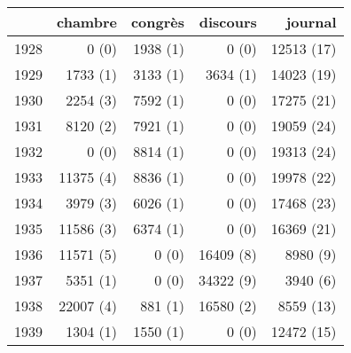 \documentclass[11pt,a4paper]{article}
\begin{document}
\begin{table} 
        \begin{tabular}{|l|r|r|r|r|} 
 \hline&chambre&congrès&discours&journal\\
\hline 
1928&0 (0)&1938 (1)&0 (0)&12513 (17)\\
1929&1733 (1)&3133 (1)&3634 (1)&14023 (19)\\
1930&2254 (3)&7592 (1)&0 (0)&17275 (21)\\
1931&8120 (2)&7921 (1)&0 (0)&19059 (24)\\
1932&0 (0)&8814 (1)&0 (0)&19313 (24)\\
1933&11375 (4)&8836 (1)&0 (0)&19978 (22)\\
1934&3979 (3)&6026 (1)&0 (0)&17468 (23)\\
1935&11586 (3)&6374 (1)&0 (0)&16369 (21)\\
1936&11571 (5)&0 (0)&16409 (8)&8980 (9)\\
1937&5351 (1)&0 (0)&34322 (9)&3940 (6)\\
1938&22007 (4)&881 (1)&16580 (2)&8559 (13)\\
1939&1304 (1)&1550 (1)&0 (0)&12472 (15)\\
\hline
        \end{tabular}
        \end{table}
\end{document}
